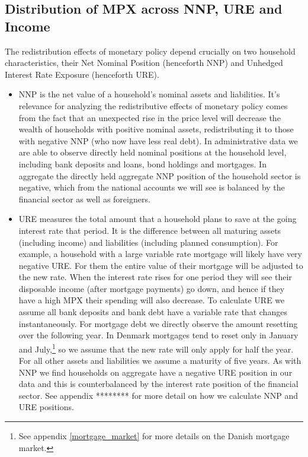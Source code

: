 \documentclass[titlepage]{\econtex}\newcommand{\texname}{ConsumptionHeterogeneity}
\begin{document}
\subsection{Distribution of MPX across NNP, URE and Income}
The redistribution effects of monetary policy depend crucially on two household characteristics, their Net Nominal Position (henceforth NNP) and Unhedged Interest Rate Exposure (henceforth URE).
\begin{itemize}
	\item NNP is the net value of a household's nominal assets and liabilities. It's relevance for analyzing the redistributive effects of monetary policy comes from the fact that an unexpected rise in the price level will decrease the wealth of households with positive nominal assets, redistributing it to those with negative NNP (who now have less real debt). In administrative data we are able to observe directly held nominal positions at the household level, including bank deposits and loans, bond holdings and mortgages. In aggregate the directly held aggregate NNP position of the household sector is negative, which from the national accounts we will see is balanced by the financial sector as well as foreigners.
	\item URE measures the total amount that a household plans to save at the going interest rate that period. It is the difference between all maturing assets (including income) and liabilities (including planned consumption). For example, a household with a large variable rate mortgage will likely have very negative URE. For them the entire value of their mortgage will be adjusted to the new rate. When the interest rate rises for one period they will see their disposable income (after mortgage payments) go down, and hence if they have a high MPX their spending will also decrease. To calculate URE we assume all bank deposits and bank debt have a variable rate that changes instantaneously. For mortgage debt we directly observe the amount resetting over the following year. In Denmark mortgages tend to reset only in January and July,\footnote{See appendix \ref{mortgage_market} for more details on the Danish mortgage market.} so we assume that the new rate will only apply for half the year. For all other assets and liabilities we assume a maturity of five years. As with NNP we find households on aggregate have a negative URE position in our data and this is counterbalanced by the interest rate position of the financial sector. See appendix ******** for more detail on how we calculate NNP and URE positions.
\end{itemize}
\end{document}
